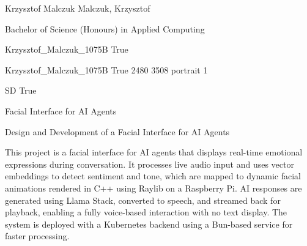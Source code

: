 \documentclass[twoside]{report}
\begin{document}
\begingroup{}\relax



\def\Key{Krzysztof_Malczuk_1075B}

{Krzysztof Malczuk}
{Malczuk, Krzysztof}

{Bachelor of Science (Honours) in Applied Computing}

{Krzysztof_Malczuk_1075B}
{True}

{Krzysztof_Malczuk_1075B}
{True}
{2480}
{3508}
{portrait}
{1}

{SD}
{True}

{Facial Interface for AI Agents}

{Design and Development of a Facial Interface for AI Agents}

{This project is a facial interface for AI agents that displays real-time emotional expressions during conversation. It processes live audio input and uses vector embeddings to detect sentiment and tone, which are mapped to dynamic facial animations rendered in C++ using Raylib on a Raspberry Pi. AI responses are generated using Llama Stack, converted to speech, and streamed back for playback, enabling a fully voice-based interaction with no text display. The system is deployed with a Kubernetes backend using a Bun-based service for faster processing.}
\end{document}
